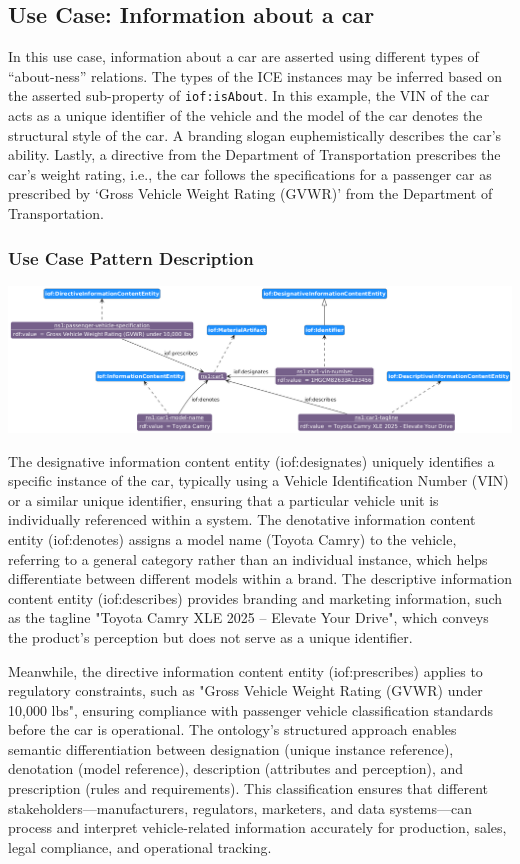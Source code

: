 \subsection*{Use Case: Information about a car}
In this use case, information about a car are asserted using different types of ``about-ness'' relations. The types of the ICE instances may be inferred based on the asserted sub-property of \texttt{iof:isAbout}. In this example, the VIN of the car acts as a unique identifier of the vehicle and the model of the car denotes the structural style of the car. A branding slogan euphemistically describes the car's ability. Lastly, a directive from the Department of Transportation prescribes the car's weight rating, i.e., the car follows the specifications for a passenger car as prescribed by `Gross Vehicle Weight Rating (GVWR)' from the Department of Transportation.   

\subsubsection*{Use Case Pattern Description}

\includegraphics[scale=0.35]{scenarios/information-and-aboutness/images/uc1-ices.png}

The designative information content entity (iof:designates) uniquely identifies a specific instance of the car, typically using a Vehicle Identification Number (VIN) or a similar unique identifier, ensuring that a particular vehicle unit is individually referenced within a system. The denotative information content entity (iof:denotes) assigns a model name (Toyota Camry) to the vehicle, referring to a general category rather than an individual instance, which helps differentiate between different models within a brand. The descriptive information content entity (iof:describes) provides branding and marketing information, such as the tagline "Toyota Camry XLE 2025 – Elevate Your Drive", which conveys the product’s perception but does not serve as a unique identifier.

Meanwhile, the directive information content entity (iof:prescribes) applies to regulatory constraints, such as "Gross Vehicle Weight Rating (GVWR) under 10,000 lbs", ensuring compliance with passenger vehicle classification standards before the car is operational. The ontology’s structured approach enables semantic differentiation between designation (unique instance reference), denotation (model reference), description (attributes and perception), and prescription (rules and requirements). This classification ensures that different stakeholders—manufacturers, regulators, marketers, and data systems—can process and interpret vehicle-related information accurately for production, sales, legal compliance, and operational tracking.

